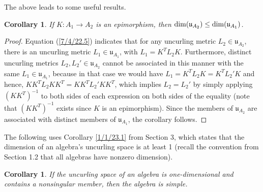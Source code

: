 \documentclass{amsart}
\numberwithin{equation}{section}
\newtheorem{corollary}[theorem]{Corollary}
\theoremstyle{definition}
\numberwithin{theorem}{section}
\begin{document}
The above leads to some useful results.  

\begin{corollary} \label{8/17/22.5} If $K:A_1\rightarrow A_2$ is an epimorphism, then ${\rm dim}(\mathfrak{u}_{A_2}) \le {\rm dim}(\mathfrak{u}_{A_1})$. \end{corollary}  

\begin{proof}   Equation (\ref{7/4/22.5}) indicates that for any uncurling metric $L_2\in \mathfrak{u}_{A_2}$, there is an uncurling metric $L_1\in \mathfrak{u}_{A_1}$, with $L_1 = K^T L_2 K$.   Furthermore, distinct uncurling metrics $L_2,L_2'\in \mathfrak{u}_{A_2}$ cannot be associated in this manner with the same $L_1\in \mathfrak{u}_{A_1}$, because in that case we would have $L_1  = K^T L_2 K = K^T L_2' K$ and hence, $KK^T L_2 KK^T = KK^T L_2' KK^T$, which implies $L_2=L_2'$ by simply applying $(KK^T)^{-1}$ to both sides of each expression on both sides of the equality (note that $(KK^T)^{-1}$ exists since $K$ is an epimorphism). Since the members of  $ \mathfrak{u}_{A_2}$ are associated with distinct members of $ \mathfrak{u}_{A_1}$, the corollary follows.   
   \end{proof}

The following uses Corollary \ref{1/1/23.1} from Section 3, which states that the dimension of an algebra's uncurling space is at least 1 (recall the convention from Section 1.2 that all algebras have nonzero dimension). 

\begin{corollary}\label{8/17/22.1} If the uncurling space of an algebra is one-dimensional and contains a nonsingular member, then the algebra is simple. \end{corollary}
\end{document}
